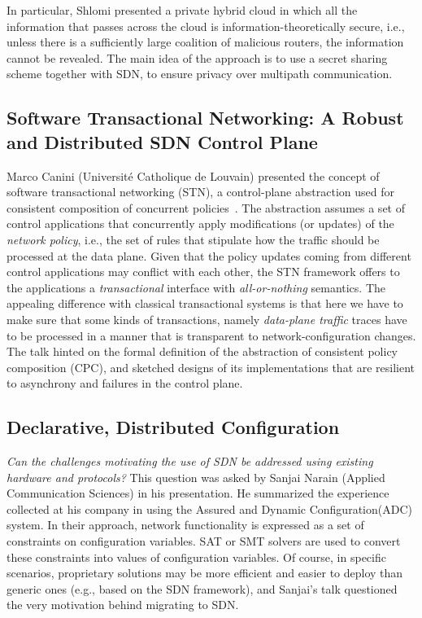 \documentclass[11pt,pdftex,letter]{article}
\begin{document}
In particular, Shlomi presented a private hybrid cloud in which all the information that passes across the cloud is information-theoretically
secure, i.e., unless there is a sufficiently large coalition of malicious routers, the information cannot be revealed. 
The main idea of the approach is to use a
secret sharing scheme together with SDN, to ensure privacy over
multipath communication.


\subsection{Software Transactional Networking: A Robust and
  Distributed SDN Control Plane}

Marco Canini (Universit\'{e} Catholique de Louvain) presented the concept of software transactional
networking (STN), a control-plane abstraction used for consistent
composition of concurrent policies~\cite{stn}. The abstraction assumes a set of
control applications that concurrently apply modifications (or
updates) of the
\emph{network policy}, i.e., the set of rules that stipulate how the
traffic should be processed at the data plane.
Given that the policy updates coming from different control applications may
conflict with each other, the STN framework offers to the applications
a \emph{transactional} interface with \emph{all-or-nothing} semantics.
The appealing difference with classical transactional systems is that
here we have to make sure that some kinds of transactions, namely
\emph{data-plane traffic} traces have to be processed in a manner that
is transparent to network-configuration changes.
The talk hinted on the formal definition of the abstraction of consistent policy
composition (CPC), and sketched designs of its implementations that
are resilient to asynchrony and failures in the control plane.

\subsection{Declarative, Distributed Configuration}

\emph{Can the challenges motivating the use of SDN be addressed using
existing hardware and protocols?} This question was  asked
by Sanjai Narain (Applied Communication Sciences) in his presentation.
He 
summarized the
experience collected at his company in using the Assured and Dynamic
Configuration(ADC) system. In their approach, network functionality is
expressed as a set of constraints on configuration variables. SAT or
SMT solvers are used to convert these constraints into values of configuration variables.
Of course, in specific scenarios, proprietary solutions may be more
efficient and  easier to deploy than generic ones (e.g., based on the
SDN framework), and Sanjai's talk questioned the very
motivation behind migrating to SDN.
\end{document}
